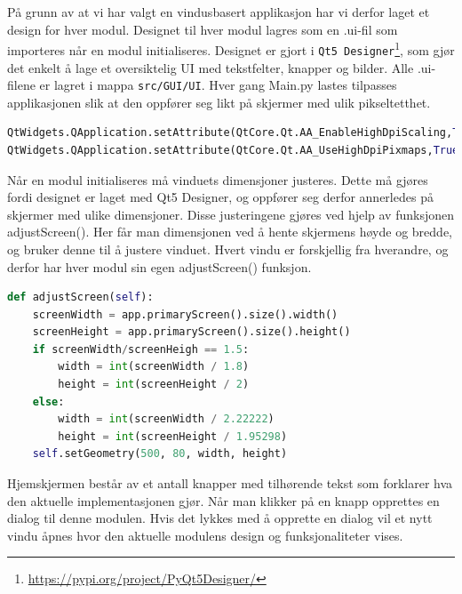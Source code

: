 På grunn av at vi har valgt en vindusbasert applikasjon har vi derfor laget et design for hver modul. Designet til hver modul lagres som en .ui-fil som importeres når en modul initialiseres. Designet er gjort i \texttt{Qt5 Designer}\footnote{\url{https://pypi.org/project/PyQt5Designer/}}, som gjør det enkelt å lage et oversiktelig UI med tekstfelter, knapper og bilder. Alle .ui-filene er lagret i mappa \texttt{src/GUI/UI}. Hver gang Main.py lastes tilpasses applikasjonen slik at den oppfører seg likt på skjermer med ulik pikseltetthet.

\begin{lstlisting}[language=Python]
QtWidgets.QApplication.setAttribute(QtCore.Qt.AA_EnableHighDpiScaling,True)
QtWidgets.QApplication.setAttribute(QtCore.Qt.AA_UseHighDpiPixmaps,True)
\end{lstlisting}

Når en modul initialiseres må vinduets dimensjoner justeres. Dette må gjøres fordi designet er laget med Qt5 Designer, og oppfører seg derfor annerledes på skjermer med ulike dimensjoner. Disse justeringene gjøres ved hjelp av funksjonen adjustScreen(). Her får man dimensjonen ved å hente skjermens høyde og bredde, og bruker denne til å justere vinduet. Hvert vindu er forskjellig fra hverandre, og derfor har hver modul sin egen adjustScreen() funksjon.

\begin{lstlisting}[language=Python]
def adjustScreen(self):
    screenWidth = app.primaryScreen().size().width()
    screenHeight = app.primaryScreen().size().height()
    if screenWidth/screenHeigh == 1.5:
        width = int(screenWidth / 1.8)
        height = int(screenHeight / 2)
    else:
        width = int(screenWidth / 2.22222)
        height = int(screenHeight / 1.95298)
    self.setGeometry(500, 80, width, height)
\end{lstlisting}

Hjemskjermen består av et antall knapper med tilhørende tekst som forklarer hva den aktuelle implementasjonen gjør. Når man klikker på en knapp opprettes en dialog til denne modulen. Hvis det lykkes med å opprette en dialog vil et nytt vindu åpnes hvor den aktuelle modulens design og funksjonaliteter vises. 

